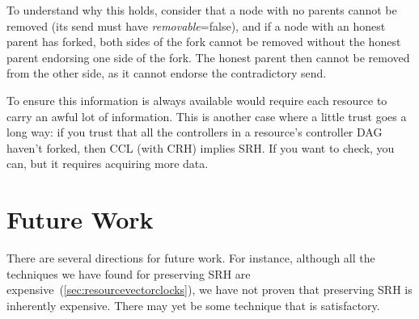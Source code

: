 \documentclass[a4paper,USenglish,cleveref, autoref, thm-restate, anonymous]{lipics-v2021}
\begin{document}
To understand why this holds, consider that a node with no parents cannot be removed (its send must have \emph{removable}=false), and if a node with an honest parent has forked, both sides of the fork cannot be removed without the honest parent endorsing one side of the fork.
The honest parent then cannot be removed from the other side, as it cannot endorse the contradictory send.

To ensure this information is always available would require each resource to carry an awful lot of information.
This is another case where a little trust goes a long way: if you trust that all the controllers in a resource's controller DAG haven't forked, then CCL (with CRH) implies SRH.
If you want to check, you can, but it requires acquiring more data.















\section{Future Work}
There are several directions for future work. 
For instance, although all the techniques we have found for preserving SRH are expensive~(\cref{sec:resourcevectorclocks}), we have not proven that preserving SRH is inherently expensive. 
There may yet be some technique that is satisfactory. 
\end{document}

